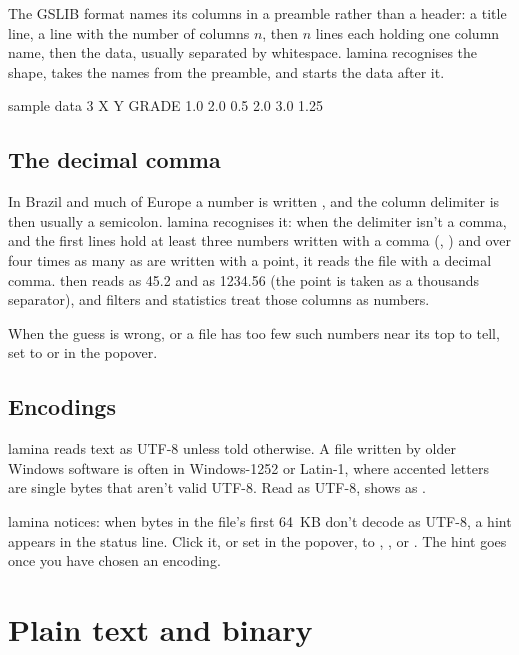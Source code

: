 The GSLIB format \parencite{deutsch1998} names its columns in a preamble rather than a header: a title
line, a line with the number of columns $n$, then $n$ lines each holding one column name, then the data,
usually separated by whitespace. lamina recognises the shape, takes the names from the preamble, and
starts the data after it.

\begin{codeblock}
sample data
3
X
Y
GRADE
1.0 2.0 0.5
2.0 3.0 1.25
\end{codeblock}

\subsection{The decimal comma}\label{sec:decimal-comma}

In Brazil and much of Europe a number is written , and the column delimiter is then usually a
semicolon. lamina recognises it: when the delimiter isn't a comma, and the first lines hold at least
three numbers written with a comma (, ) and over four times as many as are
written with a point, it reads the file with a decimal comma.  then reads as 45.2 and
 as 1234.56 (the point is taken as a thousands separator), and filters and statistics treat
those columns as numbers.

When the guess is wrong, or a file has too few such numbers near its top to tell, set  to
 or  in the popover.

\subsection{Encodings}\label{sec:encodings}

lamina reads text as UTF-8 unless told otherwise. A file written by older Windows software is often in
Windows-1252 or Latin-1, where accented letters are single bytes that aren't valid UTF-8. Read as UTF-8,
 shows as .

lamina notices: when bytes in the file's first 64~KB don't decode as UTF-8, a  hint
appears in the status line. Click it, or set  in the popover, to , ,  or . The hint goes once you have
chosen an encoding.

\section{Plain text and binary}\label{sec:text}

